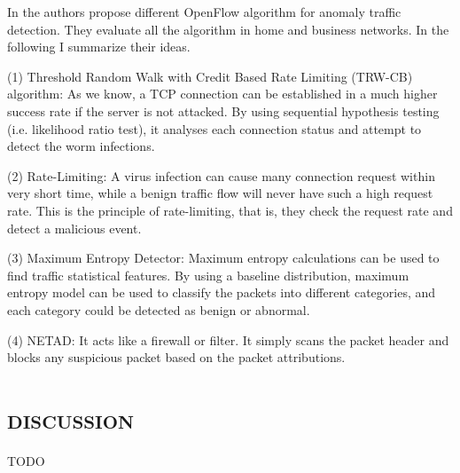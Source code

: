 In \cite{sdn-anomaly-traffic-detection} the authors propose different OpenFlow algorithm for anomaly traffic detection. They evaluate all the algorithm in home and business networks. In the following I summarize their ideas.

(1) Threshold Random Walk with Credit Based Rate Limiting (TRW-CB) algorithm: As we know, a TCP connection can be established in a much higher success rate if the server is not attacked. By using sequential hypothesis testing (i.e. likelihood ratio test), it analyses each connection status and attempt to detect the worm infections.

(2) Rate-Limiting: A virus infection can cause many connection request within very short time, while a benign traffic flow will never have such a high request rate. This is the principle of rate-limiting, that is, they check the request rate and detect a malicious event.

(3) Maximum Entropy Detector: Maximum entropy calculations can be used to find traffic statistical features. By using a baseline distribution, maximum entropy model can be used to classify the packets into different categories, and each category could be detected as benign or abnormal.

(4) NETAD: It acts like a firewall or filter. It simply scans the packet header and blocks any suspicious packet based on the packet attributions.

\section*{\small \textsc{discussion}}
TODO